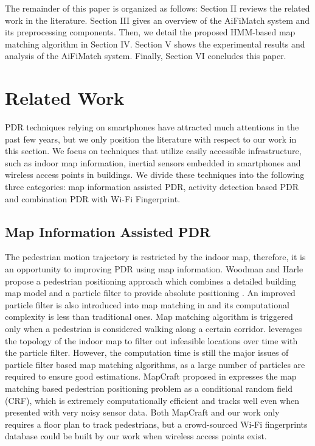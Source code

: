 \documentclass{llncs}
\begin{document}
The remainder of this paper is organized as follows: Section II reviews the related work in the literature. Section III gives an overview of the AiFiMatch system and its preprocessing components. Then, we detail the proposed HMM-based map matching algorithm in Section IV. Section V shows the experimental results and analysis of the AiFiMatch system. Finally, Section VI concludes this paper.

\section{Related Work}

PDR techniques relying on smartphones have attracted much attentions in the past few years, but we only position the literature with respect to our work in this section. We focus on techniques that utilize easily accessible infrastructure, such as indoor map information, inertial sensors embedded in smartphones and wireless access points in buildings. We divide these techniques into the following three categories: map information assisted PDR, activity detection based PDR and combination PDR with Wi-Fi Fingerprint. 

\subsection{Map Information Assisted PDR}

The pedestrian motion trajectory is restricted by the indoor map, therefore, it is an opportunity to improving PDR using map information. Woodman and Harle propose a pedestrian positioning approach which combines a detailed building map model and a particle filter to provide absolute positioning \cite{woodman2008pedestrian}. An improved particle filter is also introduced into map matching in \cite{bao2013indoor} and its computational complexity is less than traditional ones. Map matching algorithm is triggered only when a pedestrian is considered walking along a certain corridor. \cite{rai2012zee} leverages the topology of the indoor map to filter out infeasible locations over time with the particle filter. However, the computation time is still the major issues of particle filter based map matching algorithms, as a large number of particles are required to ensure good estimations. MapCraft proposed in \cite{xiao2014lightweight} expresses the map matching based pedestrian positioning problem as a conditional random field (CRF), which is extremely computationally efficient and tracks well even when presented with very noisy sensor data. Both MapCraft and our work only requires a floor plan to track pedestrians, but a crowd-sourced Wi-Fi fingerprints database could be built by our work when wireless access points exist. 
\end{document}
